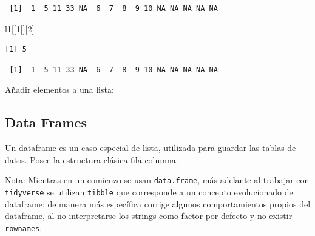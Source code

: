 \documentclass[
  letterpaper,
  DIV=11,
  numbers=noendperiod]{scrartcl}
\newenvironment{Shaded}{\begin{snugshade}}{\end{snugshade}}
\newcommand{\DecValTok}[1]{\textcolor[rgb]{0.68,0.00,0.00}{#1}}
\newcommand{\FunctionTok}[1]{\textcolor[rgb]{0.28,0.35,0.67}{#1}}
\newcommand{\NormalTok}[1]{\textcolor[rgb]{0.00,0.23,0.31}{#1}}
\newcommand{\OtherTok}[1]{\textcolor[rgb]{0.00,0.23,0.31}{#1}}
\newcommand{\SpecialCharTok}[1]{\textcolor[rgb]{0.37,0.37,0.37}{#1}}
\newcommand{\StringTok}[1]{\textcolor[rgb]{0.13,0.47,0.30}{#1}}
\begin{document}
\begin{verbatim}
 [1]  1  5 11 33 NA  6  7  8  9 10 NA NA NA NA NA
\end{verbatim}

\begin{Shaded}
\begin{Highlighting}[]
\NormalTok{l1[[}\DecValTok{1}\NormalTok{]][}\DecValTok{2}\NormalTok{]     }
\end{Highlighting}
\end{Shaded}

\begin{verbatim}
[1] 5
\end{verbatim}

\begin{Shaded}
\end{Shaded}

\begin{verbatim}
 [1]  1  5 11 33 NA  6  7  8  9 10 NA NA NA NA NA
\end{verbatim}

Añadir elementos a una lista:

\begin{Shaded}
\end{Shaded}

\subsection{Data Frames}\label{data-frames}

Un dataframe es un caso especial de lista, utilizada para guardar las
tablas de datos. Posee la estructura clásica fila columna.

Nota: Mientras en un comienzo se usan \texttt{data.frame}, más adelante
al trabajar con \texttt{tidyverse} se utilizan \texttt{tibble} que
corresponde a un concepto evolucionado de dataframe; de manera más
específica corrige algunos comportamientos propios del dataframe, al no
interpretarse los strings como factor por defecto y no existir
\texttt{rownames}.
\end{document}
